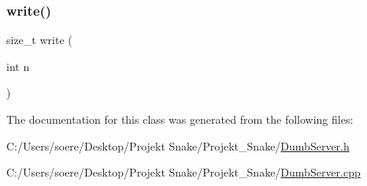 \subsubsection{\texorpdfstring{write()}{write()}\hspace{0.1cm}{\footnotesize\ttfamily [6/6]}}
{\footnotesize\ttfamily size\+\_\+t write (\begin{DoxyParamCaption}\item[{int}]{n }\end{DoxyParamCaption})\hspace{0.3cm}{\ttfamily [inline]}}



The documentation for this class was generated from the following files\+:\begin{DoxyCompactItemize}
\item 
C\+:/\+Users/soere/\+Desktop/\+Projekt Snake/\+Projekt\+\_\+\+Snake/\mbox{\hyperlink{_dumb_server_8h}{Dumb\+Server.\+h}}\item 
C\+:/\+Users/soere/\+Desktop/\+Projekt Snake/\+Projekt\+\_\+\+Snake/\mbox{\hyperlink{_dumb_server_8cpp}{Dumb\+Server.\+cpp}}\end{DoxyCompactItemize}
